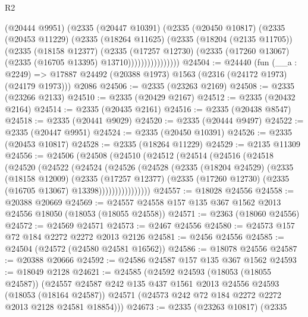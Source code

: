\begin{lexlean}{R2}
\begin{coremodule}
                  (@20444 @9951)
                  (@2335
                    (@20447 @10391)
                    (@2335
                      (@20450 @10817)
                      (@2335
                        (@20453 @11229)
                        (@2335
                          (@18264 @11625)
                          (@2335
                            (@18204 (@2135 @11705))
                            (@2335
                              (@18158 @12377)
                              (@2335
                                (@17257 @12730)
                                (@2335 (@17260 @13067) (@2335 (@16705 @13395) @13710))))))))))))))))
@24504 := @24440
    (fun (__a : @2249) => @17887 @24492 (@20388 @1973) @1563 (@2316 (@24172 @1973) (@24179 @1973)))
    @2086
@24506 := @2335 (@23263 @2169)
@24508 := @2335 (@23266 @2133)
@24510 := @2335 (@20429 @2167)
@24512 := @2335 (@20432 @2164)
@24514 := @2335 (@20435 @2161)
@24516 := @2335 (@20438 @8547)
@24518 := @2335 (@20441 @9029)
@24520 := @2335 (@20444 @9497)
@24522 := @2335 (@20447 @9951)
@24524 := @2335 (@20450 @10391)
@24526 := @2335 (@20453 @10817)
@24528 := @2335 (@18264 @11229)
@24529 := @2135 @11309
@24556 := @24506
    (@24508
      (@24510
        (@24512
          (@24514
            (@24516
              (@24518
                (@24520
                  (@24522
                    (@24524
                      (@24526
                        (@24528
                          (@2335
                            (@18204 @24529)
                            (@2335
                              (@18158 @12009)
                              (@2335
                                (@17257 @12377)
                                (@2335 (@17260 @12730) (@2335 (@16705 @13067) @13398))))))))))))))))
@24557 := @18028 @24556
@24558 := @20388 @20669
@24569 := @24557 @24558 @157 @135 @367 @1562 @2013 @24556 @18050 (@18053 (@18055 @24558))
@24571 := @2363 (@18060 @24556)
@24572 := @24569 @24571
@24573 := @2467 @24556
@24580 := @24573 @157 @72 @184 @2272 @2272 @2013 @2126
@24581 := @2456 @24556
@24585 := @24504 (@24572 (@24580 @24581 @16562))
@24586 := @18078 @24556
@24587 := @20388 @20666
@24592 := @24586 @24587 @157 @135 @367 @1562
@24593 := @18049 @2128
@24621 := @24585
    (@24592
      @24593
      (@18053 (@18055 @24587))
      (@24557
        @24587
        @242
        @135
        @437
        @1561
        @2013
        @24556
        @24593
        (@18053 (@18164 @24587))
        @24571
        (@24573 @242 @72 @184 @2272 @2272 @2013 @2128 @24581 @18854)))
@24673 := @2335
    (@23263 @10817)
    (@2335

\end{coremodule}
\end{lexlean}
